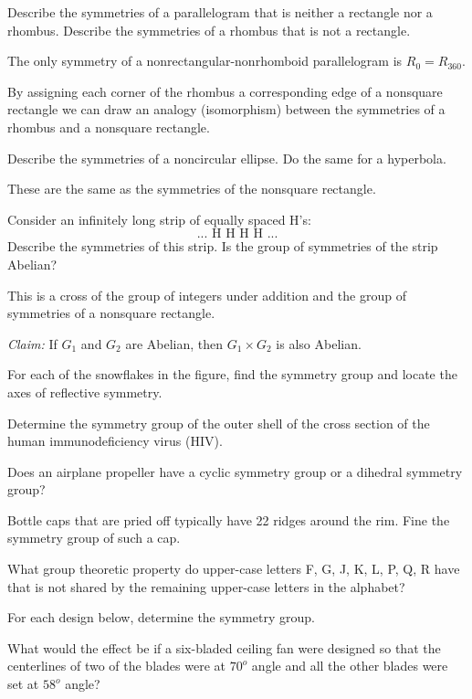 \documentclass[11pt,largemargins]{homework}
\begin{document}
\raggedright

\question 
Describe the symmetries of a parallelogram that is neither a rectangle nor a rhombus. Describe the symmetries of 
a rhombus that is not a rectangle.

\quad The only symmetry of a nonrectangular-nonrhomboid parallelogram is $R_0 = R_{360}$. 

\quad By assigning each corner of the rhombus a corresponding edge of a nonsquare rectangle we can draw an analogy (isomorphism) 
between the symmetries of a rhombus and a nonsquare rectangle.

\question 
Describe the symmetries of a noncircular ellipse. Do the same for a hyperbola.

\quad These are the same as the symmetries of the nonsquare rectangle.

\question 
Consider an infinitely long strip of equally spaced H's:
$$...\text{ H H H H }...$$
Describe the symmetries of this strip. Is the group of symmetries of the strip Abelian?

\quad This is a cross of the group of integers under addition and the group of symmetries of a nonsquare rectangle.

\quad \textit{Claim:} If $G_1$ and $G_2$ are Abelian, then $G_1 \times G_2$ is also Abelian.


\question 
For each of the snowflakes in the figure, find the symmetry group and locate the axes of reflective symmetry.


\question 
Determine the symmetry group of the outer shell of the cross section of the human immunodeficiency virus (HIV).


\question 
Does an airplane propeller have a cyclic symmetry group or a dihedral symmetry group?


\question 
Bottle caps that are pried off typically have 22 ridges around the rim. Fine the symmetry group of such a cap.


\question 
What group theoretic property do upper-case letters F, G, J, K, L, P, Q, R have that is not shared by the 
remaining upper-case letters in the alphabet?


\question 
For each design below, determine the symmetry group.


\question 
What would the effect be if a six-bladed ceiling fan were designed so that the centerlines of two of the blades were at 
$70^o$ angle and all the other blades were set at $58^o$ angle?
\end{document}
